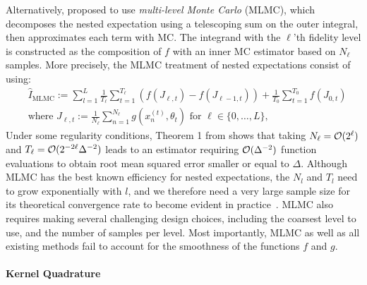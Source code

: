 Alternatively, \citet{bujok2015multilevel,Giles2015,Giles2019, giles2019decision} proposed to use \emph{multi-level Monte Carlo} (MLMC), which decomposes the nested expectation using a telescoping sum on the outer integral, then approximates each term with MC. The integrand with the $\ell$'th fidelity level is constructed as the composition of $f$ with an inner MC estimator based on $N_\ell$ samples. 
More precisely, the MLMC treatment of nested expectations consist of using:
\begin{align}\label{eq:mlmc}
    & \hat{I}_{\text{MLMC}}  :=  
    \sum_{l=1}^L  \frac{1}{T_\ell}\sum_{t=1}^{T_\ell} (f(J_{\ell,t})-f(J_{\ell-1,t})) + \frac{1}{T_0} \sum_{t=1}^{T_0} f(J_{0,t}) \nonumber \\
    & \text{where } J_{\ell,t}  := \frac{1}{N_\ell} \sum_{n=1}^{N_\ell} g(x_n^{(t)}, \theta_t) \text{ for } \ell \in \{0,\ldots,L\},
\end{align}
Under some regularity conditions, Theorem 1 from \citet{Giles2015} shows that taking $N_\ell = \mathcal{O}(2^\ell)$ and $T_\ell= \mathcal{O}(2^{-2 \ell} \Delta^{-2})$ leads to an estimator requiring $\mathcal{O}(\Delta^{-2})$ function evaluations to obtain root mean squared error smaller or equal to $\Delta$.  
Although MLMC has the best known efficiency 
for nested expectations, the $N_l$ and $T_l$ need to grow exponentially with $l$, and we therefore need a very large sample size for its theoretical convergence rate to become evident in practice~\citep{Giles2019,giles2019decision}.
MLMC also requires making several challenging design choices, including the coarsest level to use, and the number of samples per level.
Most importantly, MLMC as well as all existing methods fail to account for the smoothness of the functions $f$ and $g$. 

\paragraph{Kernel Quadrature}

